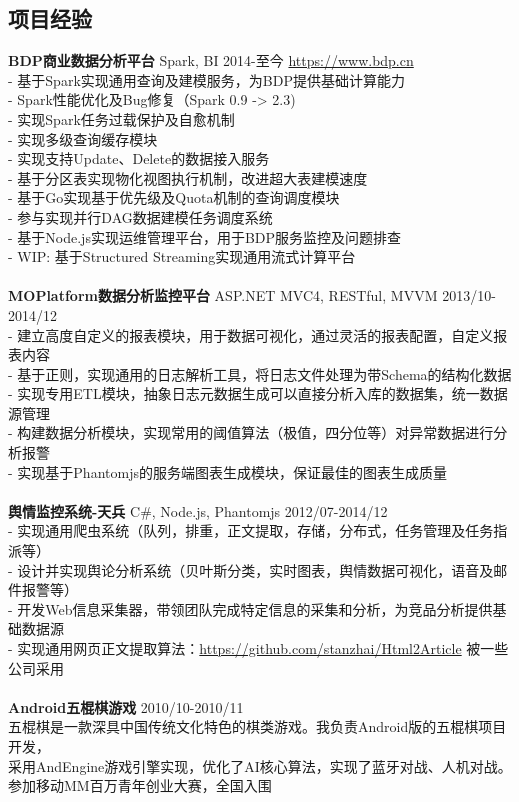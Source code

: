 \documentclass[UTF8,margin,line]{res}
\begin{document}
\begin{resume}
\section{\sc 项目经验}
\textbf{BDP商业数据分析平台} Spark, BI 2014-至今 \url{https://www.bdp.cn} \\
- 基于Spark实现通用查询及建模服务，为BDP提供基础计算能力 \\
- Spark性能优化及Bug修复（Spark 0.9 -> 2.3) \\
- 实现Spark任务过载保护及自愈机制 \\
- 实现多级查询缓存模块 \\
- 实现支持Update、Delete的数据接入服务 \\
- 基于分区表实现物化视图执行机制，改进超大表建模速度 \\
- 基于Go实现基于优先级及Quota机制的查询调度模块 \\
- 参与实现并行DAG数据建模任务调度系统 \\
- 基于Node.js实现运维管理平台，用于BDP服务监控及问题排查 \\
- WIP: 基于Structured Streaming实现通用流式计算平台 \\
\\
\textbf{MOPlatform数据分析监控平台} ASP.NET MVC4, RESTful, MVVM 2013/10-2014/12 \\
- 建立高度自定义的报表模块，用于数据可视化，通过灵活的报表配置，自定义报表内容 \\
- 基于正则，实现通用的日志解析工具，将日志文件处理为带Schema的结构化数据 \\
- 实现专用ETL模块，抽象日志元数据生成可以直接分析入库的数据集，统一数据源管理 \\
- 构建数据分析模块，实现常用的阈值算法（极值，四分位等）对异常数据进行分析报警 \\
- 实现基于Phantomjs的服务端图表生成模块，保证最佳的图表生成质量 \\
\\
\textbf{舆情监控系统-天兵} C\#, Node.js, Phantomjs 2012/07-2014/12 \\
- 实现通用爬虫系统（队列，排重，正文提取，存储，分布式，任务管理及任务指派等） \\
- 设计并实现舆论分析系统（贝叶斯分类，实时图表，舆情数据可视化，语音及邮件报警等） \\
- 开发Web信息采集器，带领团队完成特定信息的采集和分析，为竞品分析提供基础数据源 \\
- 实现通用网页正文提取算法：\url{https://github.com/stanzhai/Html2Article} 被一些公司采用 \\
\\
\textbf{Android五棍棋游戏}  2010/10-2010/11 \\
五棍棋是一款深具中国传统文化特色的棋类游戏。我负责Android版的五棍棋项目开发，\\
采用AndEngine游戏引擎实现，优化了AI核心算法，实现了蓝牙对战、人机对战。\\
参加移动MM百万青年创业大赛，全国入围


\end{resume}
\end{document}
